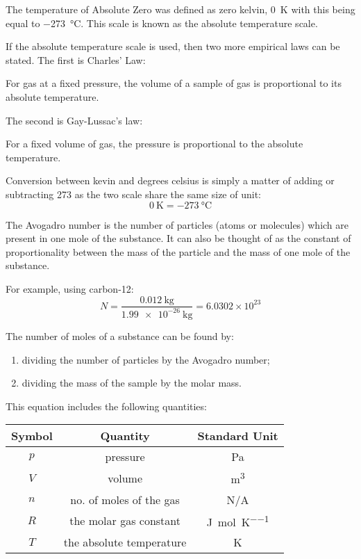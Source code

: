 \documentclass[revision-guide.tex]{subfiles}
\begin{document}
The temperature of Absolute Zero was defined as zero kelvin, \SI{0}{\kelvin} with this being equal to \SI{-273}{\celsius}. This scale is known as the absolute temperature scale.

If the absolute temperature scale is used, then two more empirical laws can be stated. The first is Charles' Law:

\begin{center}
For gas at a fixed pressure, the volume of a sample of gas is proportional to its absolute temperature.
\end{center}

The second is Gay-Lussac's law:

\begin{center}
For a fixed volume of gas, the pressure is proportional to the absolute temperature.
\end{center}


Conversion between kevin and degrees celsius is simply a matter of adding or subtracting 273 as the two scale share the same size of unit:
$$ \SI{0}{\kelvin} = \SI{-273}{\celsius}$$


The Avogadro number is the number of particles (atoms or molecules) which are present in one mole of the substance. It can also be thought of as the constant of proportionality between the mass of the particle and the mass of one mole of the substance.

For example, using carbon-12:
$$ N = \frac{\SI{0.012}{\kilo\gram}}{\SI{1.99e-26}{\kilo\gram}} = 6.0302\times10^{23}$$

The number of moles of a substance can be found by:
\begin{enumerate}
\item dividing the number of particles by the Avogadro number;
\item dividing the mass of the sample by the molar mass.
\end{enumerate}


This equation includes the following quantities:

\begin{center}\begin{tabular}{ccc}
Symbol & Quantity & Standard Unit \\ \hline
$p$ & pressure & \si{\pascal} \\
$V$ & volume & \si{\metre^3} \\
$n$ & no. of moles of the gas & N/A \\
$R$ & the molar gas constant & \si{\joule\per\mole\per\kelvin} \\
$T$ & the absolute temperature & \si{\kelvin} \\
\end{tabular}\end{center}
\end{document}
